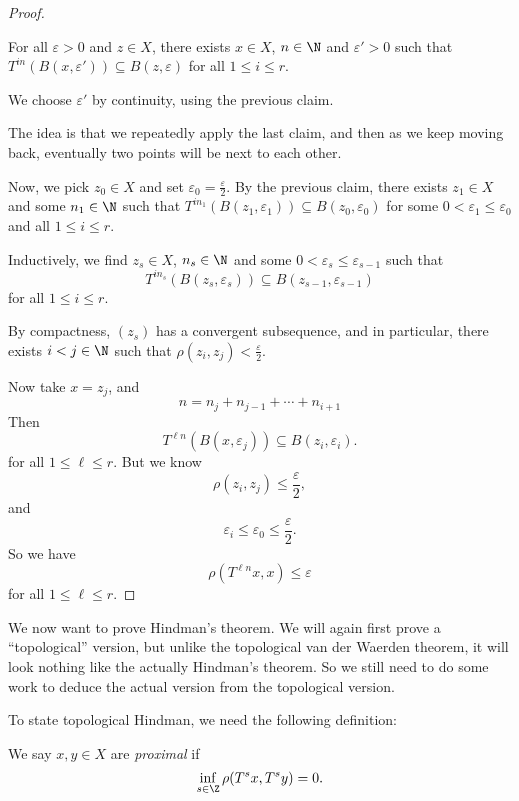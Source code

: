 \documentclass[a4paper]{article}
\begin{document}
\begin{proof}
  \begin{claim}
    For all $\varepsilon > 0$ and $z \in X$, there exists $x \in X$, $n \in \N$ and $\varepsilon' > 0$ such that $T^{in}(B(x, \varepsilon')) \subseteq B(z, \varepsilon)$ for all $1 \leq i \leq r$.
  \end{claim}
  We choose $\varepsilon'$ by continuity, using the previous claim.

  \separator
  The idea is that we repeatedly apply the last claim, and then as we keep moving back, eventually two points will be next to each other.

  Now, we pick $z_0 \in X$ and set $\varepsilon_0 = \frac{\varepsilon}{2}$. By the previous claim, there exists $z_1 \in X$ and some $n_1 \in \N$ such that $T^{in_1}(B(z_1, \varepsilon_1)) \subseteq B(z_0, \varepsilon_0)$ for some $0 < \varepsilon_1 \leq \varepsilon_0$ and all $1 \leq i \leq r$.

  Inductively, we find $z_s \in X$, $n_s \in \N$ and some $0 < \varepsilon_s \leq \varepsilon_{s - 1}$ such that
  \[
    T^{in_s}(B(z_s, \varepsilon_s)) \subseteq B(z_{s - 1}, \varepsilon_{s - 1})
  \]
  for all $1 \leq i \leq r$.

  By compactness, $(z_s)$ has a convergent subsequence, and in particular, there exists $i< j \in \N$ such that $\rho(z_i, z_j) < \frac{\varepsilon}{2}$.

  Now take $x = z_j$, and
  \[
    n = n_j + n_{j - 1} + \cdots + n_{i + 1}
  \]
  Then
  \[
    T^{\ell n} (B(x, \varepsilon_j)) \subseteq B(z_i, \varepsilon_i).
  \]
  for all $1 \leq \ell \leq r$. But we know
  \[
    \rho(z_i, z_j) \leq \frac{\varepsilon}{2},
  \]
  and
  \[
    \varepsilon_i \leq \varepsilon_0 \leq \frac{\varepsilon}{2}.
  \]
  So we have
  \[
    \rho(T^{\ell n} x, x) \leq \varepsilon
  \]
  for all $1 \leq \ell \leq r$.
\end{proof}

We now want to prove Hindman's theorem. We will again first prove a ``topological'' version, but unlike the topological van der Waerden theorem, it will look nothing like the actually Hindman's theorem. So we still need to do some work to deduce the actual version from the topological version.

To state topological Hindman, we need the following definition:
\begin{defi}
  We say $x, y \in X$ are \emph{proximal} if
  \[
    \inf_{s \in \Z} \rho(T^s x, T^s y) = 0.
  \]
\end{defi}
\end{document}
